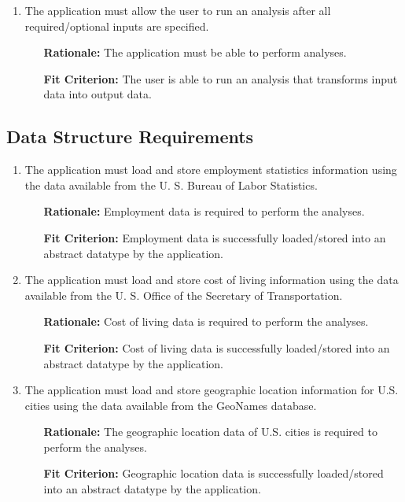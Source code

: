 \documentclass[english]{article}
\begin{document}
\begin{enumerate}[\bf{FIR}1.]
    \item The application must allow the user to run an analysis after all required/optional inputs are specified.
	\begin{enumerate}[leftmargin=1cm]
        \item [{\bf Rationale:}] The application must be able to perform analyses.
        \item [{\bf Fit Criterion:}] The user is able to run an analysis that transforms input data into output data.
	\end{enumerate}
	

\end{enumerate}

\subsection{Data Structure Requirements}
\begin{enumerate}[\bf{FDSR}1.]
	\item The application must load and store employment statistics information using the data available from the U. S. Bureau of Labor Statistics.
	\begin{enumerate}[leftmargin=1cm]
        \item [{\bf Rationale:}] Employment data is required to perform the analyses.
        \item [{\bf Fit Criterion:}] Employment data is successfully loaded/stored into an abstract datatype by the application.
	\end{enumerate}

	\item The application must load and store cost of living information using the data available from the U. S. Office of the Secretary of Transportation.
	\begin{enumerate}[leftmargin=1cm]
        \item [{\bf Rationale:}] Cost of living data is required to perform the analyses.
        \item [{\bf Fit Criterion:}] Cost of living data is successfully loaded/stored into an abstract datatype by the application.
	\end{enumerate}
	
    \item The application must load and store geographic location information for U.S. cities using the data available from the GeoNames database.
	\begin{enumerate}[leftmargin=1cm]
        \item [{\bf Rationale:}] The geographic location data of U.S. cities is required to perform the analyses.
        \item [{\bf Fit Criterion:}] Geographic location data is successfully loaded/stored into an abstract datatype by the application.
	\end{enumerate}
\end{enumerate}
\end{document}
